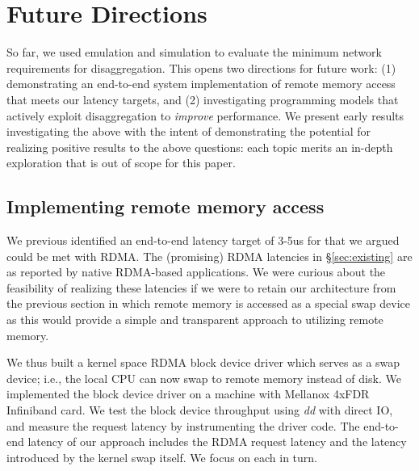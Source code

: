 \vspace{-0.1in}
\section{Future Directions}
\label{sec:future}
\vspace{-0.05in}

So far, we used emulation and simulation to evaluate the minimum network requirements for  disaggregation.%
This opens two directions for future work: (1) demonstrating an end-to-end system implementation of remote memory access that meets our latency targets, and (2) investigating programming models that actively exploit disaggregation to \emph{improve} performance.
We present early results investigating the above with the intent of demonstrating the potential for realizing positive results to the above questions: each topic merits an in-depth exploration that is out of scope for this paper.


\vspace{-0.1in}
\subsection{Implementing remote memory access}
\vspace{-0.05in}
We previous identified an end-to-end latency target of 3-5us for \dis that we argued could be met with RDMA. The (promising) RDMA latencies in \S\ref{sec:existing} are as reported by native RDMA-based applications. 
We were curious about the feasibility of realizing these latencies if we were to retain our 
architecture from the previous section in which remote memory is accessed as a special swap device as this would provide a simple and transparent approach to utilizing remote memory. 

We thus built a kernel space RDMA block device driver which serves as a swap device; i.e., the local CPU can now swap to remote memory instead of disk.
We implemented the block device driver on a machine with Mellanox  4xFDR Infiniband card.
We test the block device throughput using \textit{dd} with direct IO, and measure the request latency by instrumenting the driver code. 
The end-to-end latency of our approach includes the RDMA request latency and the latency introduced by the kernel swap itself. We focus on each in turn. 


